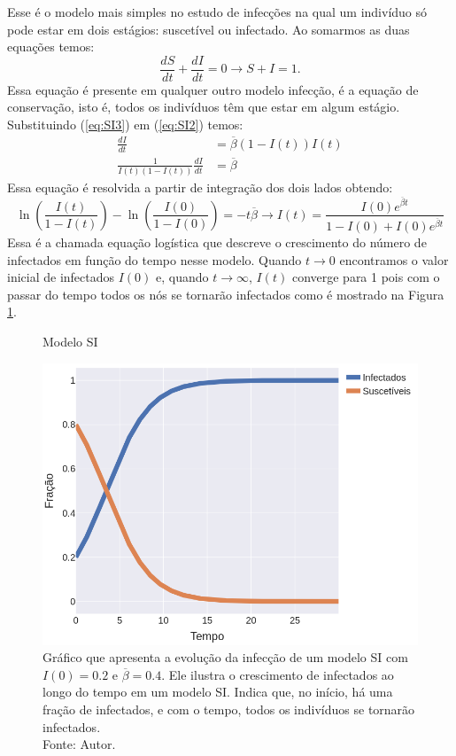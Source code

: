 Esse é o modelo mais simples no estudo de infecções na qual um indivíduo só pode estar em dois estágios: suscetível ou infectado. Ao somarmos as duas equações temos:
\begin{equation}
  \frac{dS}{dt} + \frac{dI}{dt} = 0
  \rightarrow S + I = 1.
  \label{eq:SI3}
\end{equation}
Essa equação é presente em qualquer outro modelo infecção, é a equação de conservação, isto é, todos os indivíduos têm que estar em algum estágio. Substituindo (\ref{eq:SI3}) em (\ref{eq:SI2}) temos:
\begin{align}
  \frac{dI}{dt} &=\overline{\beta}(1 - I(t))I(t)\\
  \frac{1}{I(t)(1 - I(t))}\frac{dI}{dt} &= \overline{\beta}
\end{align}
Essa equação é resolvida a partir de integração dos dois lados obtendo:
\begin{equation}
  \ln{\left(\frac{I(t)}{1 - I(t)}\right)} - \ln{\left(\frac{I(0)}{1 - I(0)}\right)}  = -t\overline{\beta} \rightarrow I(t) = \frac{I(0)e^{\overline{\beta} t}}{1 - I(0) + I(0)e^{\overline{\beta} t}}
\end{equation}
Essa é a chamada equação logística que descreve o crescimento do número de infectados em função do tempo nesse modelo. Quando $t \rightarrow 0$ encontramos o valor inicial de infectados $I(0)$ e, quando $t \rightarrow \infty$, $I(t)$ converge para 1 pois com o passar do tempo todos os nós se tornarão infectados como é mostrado na Figura \ref{SI}.

\begin{figure}[H]
  \centering
  \captionsetup{font=normalsize,skip=1pt,singlelinecheck=on,labelsep=endash}
  \caption{Modelo SI}
  \includegraphics[scale=0.5]{figuras/SI.png}
  \captionsetup{font=small,position=below,skip=-1pt}
   \caption*{Gráfico que apresenta a evolução da infecção de um modelo SI com $I(0) = 0.2$ e $\overline{\beta} = 0.4$. Ele ilustra o crescimento de infectados ao longo do tempo em um modelo SI. Indica que, no início, há uma fração de infectados, e com o tempo, todos os indivíduos se tornarão infectados.\\Fonte: Autor.}
   \label{SI}
\end{figure}

